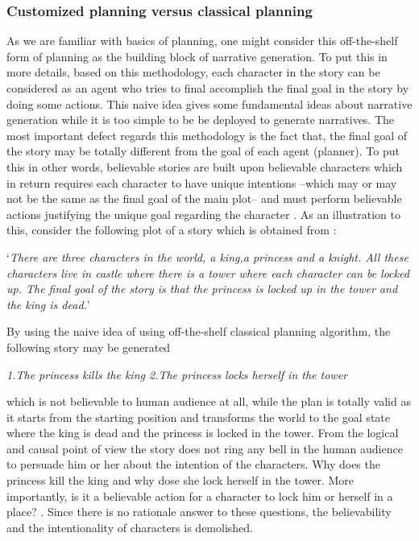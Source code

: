 \documentclass[english]{tktltiki}
\begin{document}
\subsubsection{Customized planning versus classical planning }
As we are familiar with basics of planning, one might consider this off-the-shelf form of planning as the building block of narrative generation. To put this in more details, based on this methodology, each character in the story can be considered as an agent who tries to final accomplish the final goal in the story by doing some actions. This naive idea gives some fundamental ideas about narrative generation while it is too simple to be be deployed to generate narratives.
The most important defect regards this methodology is the fact that, the final goal of the story may be totally different from the goal of each agent (planner). To put this in other words, believable stories are built upon believable characters which in return requires each character to have unique intentions --which may or may not be the same as the final goal of the main plot-- and must perform believable actions justifying the unique goal regarding the character \cite{planning:2010:NPB:1946417.1946422}. As an illustration to this, consider the following plot of a story which is obtained from \cite{planning:2010:NPB:1946417.1946422}:
\begin{flushleft}
`\textit{There are three characters in the world, a king,a princess and a knight. All these characters live in castle where there is a tower where each character can be locked up. The final goal of the story is that the princess is locked up in the tower and the king is dead.}'
\end{flushleft}
By using the naive idea of using off-the-shelf classical planning algorithm, the following story may be generated
\begin{flushleft}
\textit{1.The princess kills the king \newline 2.The princess locks herself in the tower}
\end{flushleft}
which is not believable to human audience at all, while the plan is totally valid as it starts from the starting position and transforms the world to the goal state where the king is dead and the princess is locked in the tower. From the logical and causal point of view the story does not ring any bell in the human audience to persuade him or her about the intention of the characters. Why does the princess kill the king and why dose she lock herself in the tower. More importantly, is it a believable action for a character to lock him or herself in a place? . Since there is no rationale answer to these questions, the believability and the intentionality of characters is demolished.
\end{document}
